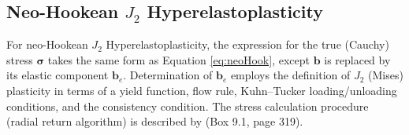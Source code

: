 \documentclass[sn-mathphys,Numbered]{sn-jnl}%
\newcommand{\bb}{\boldsymbol}
\begin{document}
\begin{appendices}
\subsection{Neo-Hookean $J_2$ Hyperelastoplasticity}
For neo-Hookean $J_2$ Hyperelastoplasticity, the expression for the true (Cauchy) stress $\bb{\sigma}$ takes the same form as Equation \ref{eq:neoHook}, except $\boldsymbol{b}$ is replaced by its elastic component $\boldsymbol{b}_e$.
Determination of $\boldsymbol{b}_e$ employs the definition of $J_2$ (Mises) plasticity in terms of a yield function, flow rule, Kuhn–Tucker loading/unloading conditions, and the consistency condition.
The stress calculation procedure (radial return algorithm) is described by \citet{Simo1998} (Box 9.1, page 319).


\end{appendices}
\end{document}
